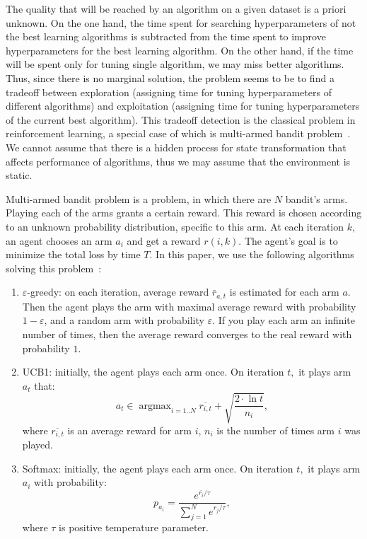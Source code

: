 \documentclass{svproc}
\DeclareMathOperator*{\argmax}{argmax}
\begin{document}
The quality that will be reached by an algorithm on a given dataset is a priori unknown. On the one hand, the time spent for searching hyperparameters of not the best learning algorithms is subtracted from the time spent to improve hyperparameters for the best learning algorithm. On the other hand, if the time will be spent only for tuning single algorithm, we may miss better algorithms. Thus, since there is no marginal solution, the problem seems to be to find a tradeoff between exploration (assigning time for tuning hyperparameters of different algorithms) and exploitation (assigning time for tuning hyperparameters of the current best algorithm). This tradeoff detection is the classical problem in reinforcement learning, a special case of which is multi-armed bandit problem~\cite{reinfl}. We cannot assume that there is a hidden process for state transformation that affects performance of algorithms, thus we may assume that the environment is static.   

Multi-armed bandit problem is a problem, in which there are $N$ bandit's arms. Playing each of the arms grants a certain reward. This reward is chosen according to an unknown probability distribution, specific to this arm. At each iteration $k,$ an agent chooses an arm $a_i$ and get a reward $r(i, k)$. The agent's goal is to minimize the total loss by time $T$. In this paper, we use the following algorithms solving this problem~\cite{reinfl}:
\begin{enumerate}
\item $\varepsilon$-greedy: on each iteration, average reward $\bar r_{a, t}$ is estimated for each arm $a.$ Then the agent plays the arm with maximal average reward with probability $1 - \varepsilon$, and a random arm with probability $\varepsilon.$ If you play each arm an infinite number of times, then the average reward converges to the real reward with probability $1.$

\item  UCB1: initially, the agent plays each arm once. On iteration $t,$ it plays arm $a_t$ that:
\[
a_t \in \argmax_{i=1..N}  \overline {r_{i,t}} + \sqrt{\frac {2 \cdot \ln t} {n_i}}, 
\]  
where $\overline {r_{i,t}}$ is an average reward for arm $i$, $n_i$ is the number of times arm $i$ was played. 

\item Softmax: initially, the agent plays each arm once. On iteration $t,$ it plays arm $a_i$ with probability:
\[
p_{a_i} = \frac{e^{{\bar{r_i} / \tau}}}{\sum_{j=1}^N e^{r_j / \tau}},
\]
where $\tau$ is positive temperature parameter. %
\end{enumerate}
\end{document}
